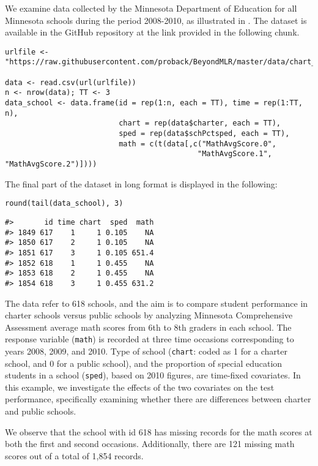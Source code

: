 We examine data collected by the Minnesota Department of Education for
all Minnesota schools during the period 2008-2010, as illustrated in
\cite{roba:21}. The dataset is available in the GitHub repository at the
link provided in the following chunk.

\begin{verbatim}
urlfile <- "https://raw.githubusercontent.com/proback/BeyondMLR/master/data/chart_wide_condense.csv"

data <- read.csv(url(urlfile))
n <- nrow(data); TT <- 3
data_school <- data.frame(id = rep(1:n, each = TT), time = rep(1:TT, n),
                          chart = rep(data$charter, each = TT),
                          sped = rep(data$schPctsped, each = TT),
                          math = c(t(data[,c("MathAvgScore.0",
                                            "MathAvgScore.1", "MathAvgScore.2")])))
\end{verbatim}

The final part of the dataset in long format is displayed in the
following:

\begin{verbatim}
round(tail(data_school), 3)
\end{verbatim}

\begin{verbatim}
#>       id time chart  sped  math
#> 1849 617    1     1 0.105    NA
#> 1850 617    2     1 0.105    NA
#> 1851 617    3     1 0.105 651.4
#> 1852 618    1     1 0.455    NA
#> 1853 618    2     1 0.455    NA
#> 1854 618    3     1 0.455 631.2
\end{verbatim}

The data refer to 618 schools, and
the aim is to compare student performance in charter schools versus public
schools by analyzing Minnesota Comprehensive Assessment average math
scores from 6th to 8th graders in each school. The response variable
(\texttt{math}) is recorded at three time occasions corresponding to years
2008, 2009, and 2010. Type of school (\texttt{chart}: coded as 1 for a charter
school, and 0 for a public school), and the proportion of special
education students in a school (\texttt{sped}), based on 2010 figures, are
time-fixed covariates. In this example, we investigate the effects of
the two covariates on the test performance, specifically examining
whether there are differences between charter and public schools.

We observe that the school with id 618 has missing records for the math
scores at both the first and second occasions. Additionally, there are
121 missing math scores out of a total of 1,854 records.

